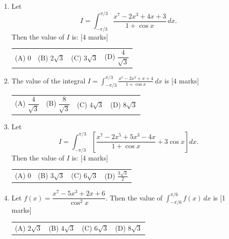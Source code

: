 \documentclass[11pt,a4paper]{article}
\begin{document}
\begin{enumerate}[resume]
{\begin{tabularx}{\linewidth}{X X X X}
\end{tabularx}}
\item Let
\[
I=\int_{-\pi/3}^{\pi/3}\frac{x^7-2x^3+4x+3}{1+\cos x}\,dx.
\]
Then the value of $I$ is: \hfill [4 marks]
{\renewcommand{\arraystretch}{1.8}
\begin{tabularx}{\linewidth}{X X X X}
(A) \quad $0$ & (B) \quad $2\sqrt{3}$ & (C) \quad $3\sqrt{3}$ & (D) \quad $\dfrac{4}{\sqrt{3}}$ \\[10pt]
\end{tabularx}}
\item The value of the integral $I=\displaystyle\int_{-\pi/3}^{\pi/3}\frac{x^5-2x^3+x+4}{1+\cos x}\,dx$ is \hfill [4 marks]
{\renewcommand{\arraystretch}{1.8}
\begin{tabularx}{\linewidth}{X X X X}
(A) \quad $\dfrac{4}{\sqrt{3}}$ & (B) \quad $\dfrac{8}{\sqrt{3}}$ & (C) \quad $4\sqrt{3}$ & (D) \quad $8\sqrt{3}$ \\[10pt]
\end{tabularx}}
\item Let
\[
I=\int_{-\pi/3}^{\pi/3}\left[\frac{x^7-2x^5+5x^3-4x}{1+\cos x}+3\cos x\right]dx.
\]
Then the value of $I$ is: \hfill [4 marks]
{\renewcommand{\arraystretch}{1.8}
\begin{tabularx}{\linewidth}{X X X X}
(A) \quad $0$ & (B) \quad $3\sqrt{3}$ & (C) \quad $6\sqrt{3}$ & (D) \quad $\frac{3\sqrt{3}}{2}$ \\[10pt]
\end{tabularx}}
\item Let \(f(x)=\dfrac{x^7-5x^3+2x+6}{\cos^2 x}\). Then the value of \(\displaystyle \int_{-\pi/6}^{\pi/6} f(x)\,dx\) is \hfill [1 marks]
{\renewcommand{\arraystretch}{1.8}
\begin{tabularx}{\linewidth}{X X X X}
(A) \quad \(2\sqrt{3}\) & (B) \quad \(4\sqrt{3}\) & (C) \quad \(6\sqrt{3}\) & (D) \quad \(8\sqrt{3}\) \\[10pt]
\end{tabularx}}
\end{enumerate}
\end{document}

